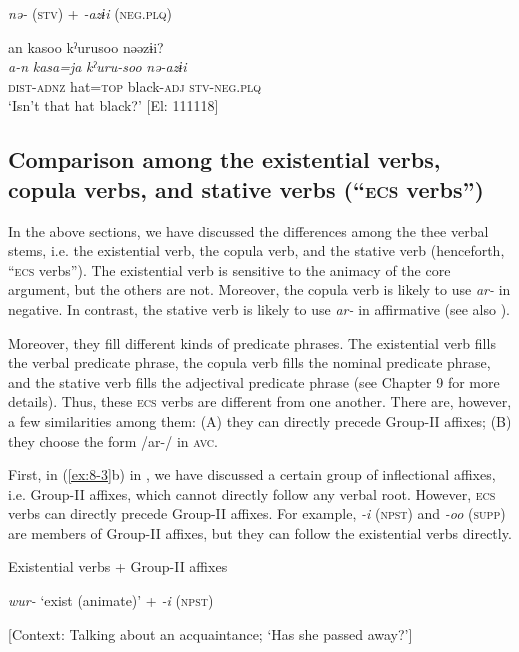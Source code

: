 \ex \textit{nə-} (\textsc{stv}) + \textit{-azɨi} (\textsc{neg}.\textsc{plq})

{\TM}
\glll  an  kasoo  kˀurusoo  nəəzɨi?\\
\textit{a-n}  \textit{kasa=ja}  \textit{kˀuru-soo}  \textit{nə-azɨi}\\
\textsc{dist}-\textsc{adnz}  hat=\textsc{top}  black-\textsc{adj}  \textsc{stv}-\textsc{neg}.\textsc{plq}\\
\glt ‘Isn’t that hat black?’ [El: 111118]
\z
\z

\subsection{Comparison among the existential verbs, copula verbs, and stative verbs (“\textsc{ecs} verbs”)}

In the above sections, we have discussed the differences among the thee verbal stems, i.e. the existential verb, the copula verb, and the stative verb (henceforth, “\textsc{ecs} verbs”). The existential verb is sensitive to the animacy of the core argument, but the others are not. Moreover, the copula verb is likely to use \textit{ar-} in negative. In contrast, the stative verb is likely to use \textit{ar-} in affirmative (see also ).

Moreover, they fill different kinds of predicate phrases. The existential verb fills the verbal predicate phrase, the copula verb fills the nominal predicate phrase, and the stative verb fills the adjectival predicate phrase (see Chapter 9 for more details). Thus, these \textsc{ecs} verbs are different from one another. There are, however, a few similarities among them: (A) they can directly precede Group-II affixes; (B) they choose the form /ar-/ in \textsc{avc}.

  First, in (\ref{ex:8-3}b) in , we have discussed a certain group of inflectional affixes, i.e. Group-II affixes, which cannot directly follow any verbal root. However, \textsc{ecs} verbs can directly precede Group-II affixes. For example, \textit{-i} (\textsc{npst}) and \textit{-oo} (\textsc{supp}) are members of Group-II affixes, but they can follow the existential verbs directly.

\ea\label{ex:8-50}
  Existential verbs + Group-II affixes

\ea \textit{wur-} ‘exist (animate)’ + \textit{-i} (\textsc{npst})

    [Context: Talking about an acquaintance;
    {\US}
  ‘Has she passed away?’]\\

